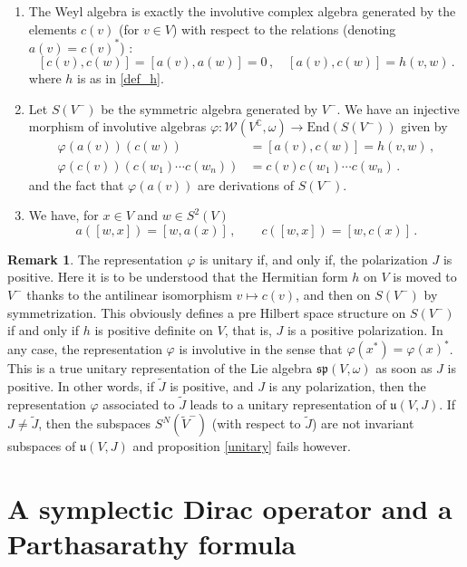 \documentclass{amsart}[draft,11pt]
\numberwithin{equation}{section}
\theoremstyle{definition}
\newtheorem{remark}[theorem]{Remark}
\begin{document}
\begin{enumerate}
\item The Weyl algebra is exactly  the involutive complex algebra generated by the elements $c(v)$ (for $v\in V$) with respect to the  relations (denoting $a(v)=c(v)^*$) :
$$
[c(v),c(w)]=[a(v),a(w)]=0\,,\quad [a(v),c(w)]=h(v,w)\,.
$$
where $h$ is as in \eqref{def_h}.
 \item Let $S(V^-)$ be the symmetric algebra generated by $V^-$. We have an injective morphism of involutive algebras
$\varphi \colon \mathcal{W}(V^\mathbb{C},\omega) \mathop{\longrightarrow}\limits \mathrm{End}(S(V^-))$
given by 
\begin{align*}
 \varphi(a(v))(c(w))&=[a(v),c(w)]=h(v,w)\,,
\\ 
\varphi(c(v))(c(w_1)\cdots c(w_n))&=c(v)c(w_1)\cdots c(w_n)\,.   
\end{align*}
and the fact that $\varphi(a(v))$ are derivations of $S(V^-)$.

\item  We have, for $x\in V$ and $w\in S^2(V)$
$$ a([w,x]) = [w,a(x)]\,,\qquad
c([w,x]) = [w,c(x)]\,.$$
\end{enumerate}

\begin{remark}
The representation $\varphi$ is unitary if, and only
if, the polarization $J$ is positive. 
Here it is to be understood that
the Hermitian form $h$ on $V$ is moved to $V^-$ thanks to
the antilinear isomorphism $v\mapsto c(v)$, 
and then on $S(V^-)$
by symmetrization. This obviously defines a 
pre Hilbert space structure on $S(V^-)$ if and only 
if $h$ is positive definite on $V$, 
that is, $J$ is a positive polarization.
In any case, the representation $\varphi$ is involutive in the sense that $\varphi(x^*)=\varphi(x)^*$. This is a true unitary representation of the Lie algebra $\mathfrak{sp}(V,\omega)$ as soon as $J$ is positive.
In other words, if $\tilde{J}$ is positive, and $J$
is any polarization, then the representation $\varphi$
associated to $\tilde{J}$ leads to a unitary representation of $\mathfrak{u}(V,J)$. If $J\neq\tilde{J}$, then the subspaces $S^N(\widetilde{V}^-)$ (with respect
to $\tilde{J}$) are not invariant subspaces of $\mathfrak{u}(V,J)$ and proposition \ref{unitary} fails however. 
\end{remark}

\section{A symplectic Dirac operator and a Parthasarathy formula}\label{s:partha}
\end{document}
